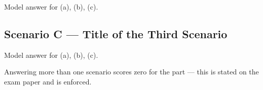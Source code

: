 \begin{ans}
Model answer for (a), (b), (c).
\end{ans}

\subsection*{Scenario C --- Title of the Third Scenario}

\begin{ans}
Model answer for (a), (b), (c).
\end{ans}

\begin{caution}
Answering more than one scenario scores zero for the part --- this is stated
on the exam paper and is enforced.
\end{caution}
